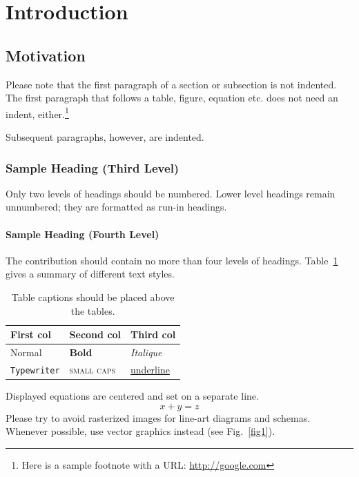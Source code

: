 \section{Introduction}
\label{sec:intro}

\subsection{Motivation}
\label{sec:intro:sub:motivation}

Please note that the first paragraph of a section or subsection is not indented.
The first paragraph that follows a table, figure, equation etc. does not need an indent, either.\footnote{Here is a sample footnote with a URL: \url{http://google.com}}

Subsequent paragraphs, however, are indented.

\subsubsection{Sample Heading (Third Level)} Only two levels of
headings should be numbered. Lower level headings remain unnumbered; they are formatted as run-in headings.

\paragraph{Sample Heading (Fourth Level)}
The contribution should contain no more than four levels of headings. 
Table~\ref{tab1} gives a summary of different text styles.

\begin{table}
\caption{Table captions should be placed above the
tables.}\label{tab1}
\centering
\begin{tabular}{|l|l|l|}
\hline
First col &  Second col & Third col\\
\hline
Normal & \textbf{Bold} & \textit{Italique}\\
\texttt{Typewriter} & \textsc{small caps} & \underline{underline}\\
\hline
\end{tabular}
\end{table}


\noindent Displayed equations are centered and set on a separate
line.
\begin{equation}
x + y = z
\end{equation}
Please try to avoid rasterized images for line-art diagrams and schemas. 
Whenever possible, use vector graphics instead (see Fig.~\ref{fig1}).

